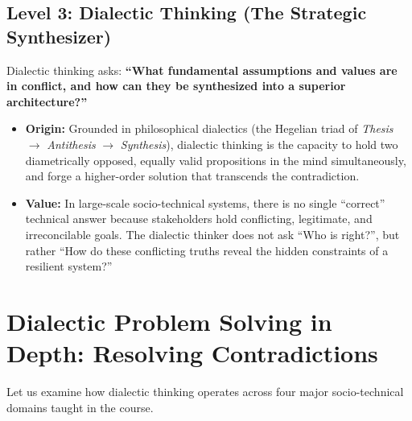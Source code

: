\subsection{Level 3: Dialectic Thinking (The Strategic Synthesizer)}
Dialectic thinking asks: \textbf{``What fundamental assumptions and values are in conflict, and how can they be synthesized into a superior architecture?''}
\begin{itemize}[leftmargin=1.5em]
    \item \textbf{Origin:} Grounded in philosophical dialectics (the Hegelian triad of \textit{Thesis} $\to$ \textit{Antithesis} $\to$ \textit{Synthesis}), dialectic thinking is the capacity to hold two diametrically opposed, equally valid propositions in the mind simultaneously, and forge a higher-order solution that transcends the contradiction.
    \item \textbf{Value:} In large-scale socio-technical systems, there is no single ``correct'' technical answer because stakeholders hold conflicting, legitimate, and irreconcilable goals. The dialectic thinker does not ask ``Who is right?'', but rather ``How do these conflicting truths reveal the hidden constraints of a resilient system?''
\end{itemize}

\section{Dialectic Problem Solving in Depth: Resolving Contradictions}
\label{sec:dialectic_depth}

Let us examine how dialectic thinking operates across four major socio-technical domains taught in the course.

